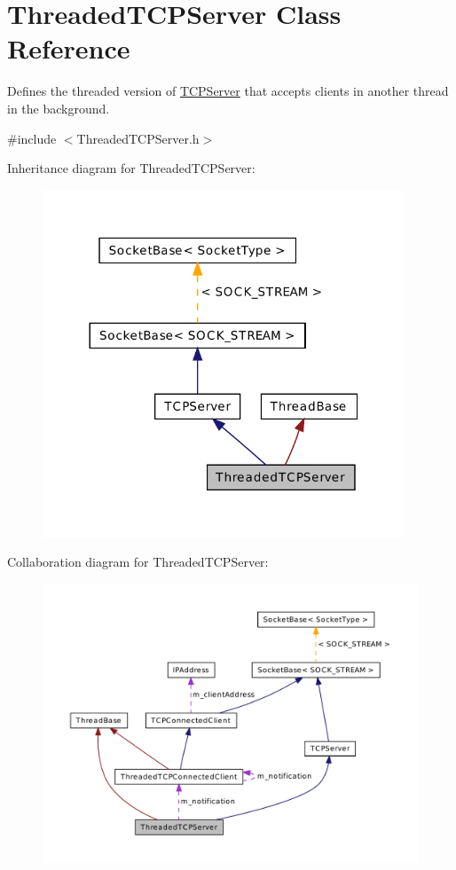 \hypertarget{class_threaded_t_c_p_server}{\section{Threaded\-T\-C\-P\-Server Class Reference}
\label{class_threaded_t_c_p_server}
}


Defines the threaded version of \hyperlink{class_t_c_p_server}{T\-C\-P\-Server} that accepts clients in another thread in the background.  




{\ttfamily \#include $<$Threaded\-T\-C\-P\-Server.\-h$>$}



Inheritance diagram for Threaded\-T\-C\-P\-Server\-:\nopagebreak
\begin{figure}[H]
\begin{center}
\leavevmode
\includegraphics[width=305pt]{class_threaded_t_c_p_server__inherit__graph}
\end{center}
\end{figure}


Collaboration diagram for Threaded\-T\-C\-P\-Server\-:\nopagebreak
\begin{figure}[H]
\begin{center}
\leavevmode
\includegraphics[width=350pt]{class_threaded_t_c_p_server__coll__graph}
\end{center}
\end{figure}
